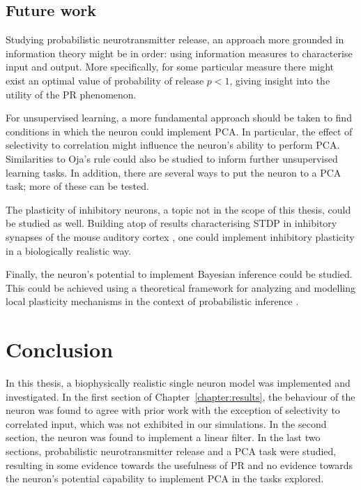 \documentclass[a4paper,12pt]{report}
\theoremstyle{definition}
\begin{document}
\section{Future work}

Studying probabilistic neurotransmitter release, an approach more grounded in information theory might be in order: using information measures to characterise input and output. More specifically, for some particular measure there might exist an optimal value of probability of release $p < 1$, giving insight into the utility of the PR phenomenon.

For unsupervised learning, a more fundamental approach should be taken to find conditions in which the neuron could implement PCA. In particular, the effect of selectivity to correlation might influence the neuron's ability to perform PCA. Similarities to Oja's rule could also be studied to inform further unsupervised learning tasks. In addition, there are several ways to put the neuron to a PCA task; more of these can be tested. 

The plasticity of inhibitory neurons, a topic not in the scope of this thesis, could be studied as well. Building atop of results characterising STDP in inhibitory synapses of the mouse auditory cortex \cite{d2015inhibitory}, one could implement inhibitory plasticity in a biologically realistic way.

Finally, the neuron's potential to implement Bayesian inference could be studied. This could be achieved using a theoretical framework for analyzing and modelling local plasticity mechanisms in the context of probabilistic inference \cite{kappel2015network}.



\chapter*{Conclusion}

In this thesis, a biophysically realistic single neuron model was implemented and investigated. In the first section of Chapter~\ref{chapter:results}, the behaviour of the neuron was found to agree with prior work with the exception of selectivity to correlated input, which was not exhibited in our simulations. In the second section, the neuron was found to implement a linear filter. In the last two sections, probabilistic neurotransmitter release and a PCA task were studied, resulting in some evidence towards the usefulness of PR and no evidence towards the neuron's potential capability to implement PCA in the tasks explored.
\end{document}
